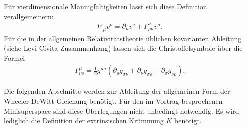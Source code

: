 \documentclass{scrartcl}
\begin{document}
		Für vierdimensionale Mannigfaltigkeiten lässt sich diese Definition verallgemeinern:
		\begin{align*}
			\nabla_\mu v^\nu=\partial_\mu v^\nu +\Gamma^\nu_{\rho\mu}v^\rho.
		\end{align*}
		Für die in der allgemeinen Relativitätstheorie üblichen kovarianten Ableitung (siehe Levi-Civita Zusammenhang) lassen sich die Christoffelsymbole
		über die Formel
		\begin{align}
			\Gamma^\mu_{\nu\rho}=\frac{1}{2}g^{\mu\sigma}(\partial_\rho g_{\sigma \nu}+\partial_\nu g_{\sigma \rho}-\partial_\sigma g_{\nu\rho}).
			\label{def:christ}
		\end{align}
		
		Die folgenden Abschnitte werden zur Ableitung der allgemeinen Form der Wheeler-DeWitt Gleichung benötigt. Für den im Vortrag
		besprochenen Minisuperspace sind diese Überlegungen nicht unbedingt notwendig. Es wird lediglich die Definition der extrinsischen Krümmung $K$ benötigt.
\end{document}
